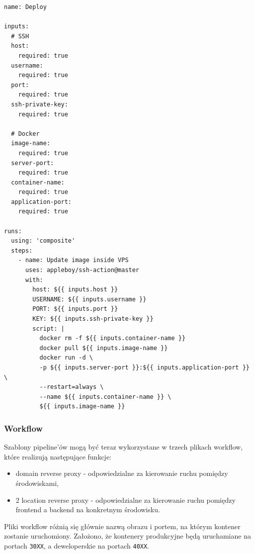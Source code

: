 \documentclass{article}
\begin{document}
\begin{lstlisting}[caption=Plik \texttt{.github/templates/deploy-container/action.yml}]
name: Deploy

inputs:
  # SSH
  host:
    required: true
  username:
    required: true
  port:
    required: true
  ssh-private-key:
    required: true

  # Docker
  image-name:
    required: true
  server-port:
    required: true
  container-name:
    required: true
  application-port:
    required: true

runs:
  using: 'composite'
  steps:
    - name: Update image inside VPS
      uses: appleboy/ssh-action@master
      with:
        host: ${{ inputs.host }}
        USERNAME: ${{ inputs.username }}
        PORT: ${{ inputs.port }}
        KEY: ${{ inputs.ssh-private-key }}
        script: |
          docker rm -f ${{ inputs.container-name }}
          docker pull ${{ inputs.image-name }}
          docker run -d \
          -p ${{ inputs.server-port }}:${{ inputs.application-port }} \
          --restart=always \
          --name ${{ inputs.container-name }} \
          ${{ inputs.image-name }}
\end{lstlisting}

\subsubsection{Workflow}

Szablony pipeline’ów mogą być teraz wykorzystane w trzech plikach workflow, które realizują następujące funkcje:

\begin{itemize}
    \item domain reverse proxy - odpowiedzialne za kierowanie ruchu pomiędzy środowiskami,
    \item 2 location reverse proxy - odpowiedzialne za kierowanie ruchu pomiędzy frontend a backend na konkretnym środowisku.
\end{itemize}

Pliki workflow różnią się głównie nazwą obrazu i portem, na którym kontener zostanie uruchomiony. Założono, że kontenery produkcyjne będą uruchamiane na portach \lstinline|30XX|, a deweloperskie na portach \lstinline|40XX|.
\end{document}
